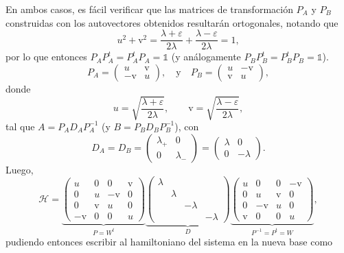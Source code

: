 \documentclass{scrartcl}
\DeclareRobustCommand{\[}{\begin{equation}}
\DeclareRobustCommand{\]}{\end{equation}}
\begin{document}
\begin{enumerate}
\begin{enumerate}
\begin{enumerate}[(i)]
{                En ambos casos, es fácil verificar que las matrices de transformación $P_A$ y $P_B$ construidas con los autovectores obtenidos resultarán ortogonales, notando que
                \[ u^2 + \mathrm{v}^2 = \frac{\lambda + \varepsilon}{2\lambda} + \frac{\lambda - \varepsilon}{2\lambda} = 1, \]
                por lo que entonces $P_A P_A^t = P_A^t P_A = \mathds{1}$ (y análogamente $P_B P_B^t = P_B^t P_B = \mathds{1}$).
            }
            \[ P_A = \begin{pmatrix} u & \mathrm{v} \\ -\mathrm{v} & u \end{pmatrix}, \quad \text{y} \quad P_B = \begin{pmatrix} u & -\mathrm{v} \\ \mathrm{v} & u \end{pmatrix}, \]
            donde
            \[ u = \sqrt{\frac{\lambda + \varepsilon}{2\lambda}}, \quad \quad \mathrm{v} = \sqrt{\frac{\lambda - \varepsilon}{2\lambda}}, \]
            tal que $A = P_A D_A P_A^{-1}$ (y $B = P_B D_B P_B^{-1}$), con
            \[ D_A = D_B = \begin{pmatrix} \lambda_+ & 0 \\ 0 & \lambda_- \end{pmatrix} = \begin{pmatrix} \lambda & 0 \\ 0 & -\lambda \end{pmatrix}. \]
            Luego, 
            \[ \mathcal{H} = \underbrace{\begin{pmatrix} u & 0 & 0 & \mathrm{v} \\ 0 & u & -\mathrm{v} & 0 \\ 0 & \mathrm{v} & u & 0 \\ -\mathrm{v} & 0 & 0 & u \end{pmatrix}}_{P = W^t} \underbrace{\begin{pmatrix} \lambda & & & \\ & \lambda & & \\ & & -\lambda & \\ & & & -\lambda \end{pmatrix}}_{D} \underbrace{\begin{pmatrix} u & 0 & 0 & -\mathrm{v} \\ 0 & u & \mathrm{v} & 0 \\ 0 & -\mathrm{v} & u & 0 \\ \mathrm{v} & 0 & 0 & u \end{pmatrix}}_{P^{-1} = P^t = W}, \]
            pudiendo entonces escribir al hamiltoniano del sistema en la nueva base como

\end{enumerate}
\end{enumerate}
\end{enumerate}
\end{document}
